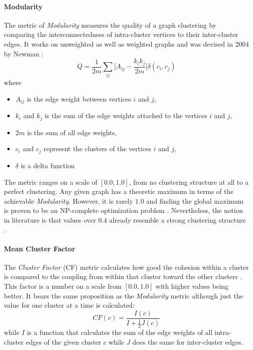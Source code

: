 \documentclass[12pt,a4paper]{report}
\begin{document}
\paragraph{Modularity}
The metric of \textit{Modularity} measures the quality of a graph clustering
by comparing the interconnectedness of intra-cluster vertices to their
inter-cluster edges. It works on unweighted as well as weighted graphs
\cite{clauset2004modularity, blondel2008modularity}
and was devised in 2004 by Newman \cite{newman2004fast}:
\[
  Q =
  \frac{1}{2m}
  \sum \limits _{ij}{\bigg[ A_{ij} - \frac{k_i k_j}{2m} \bigg]}
  \delta (c_i, c_j)
\]
where
\begin{itemize}[noitemsep]
  \item \(A_{ij}\) is the edge weight between vertices \(i\) and \(j\),
  \item \(k_i\) and \(k_j\) is the sum of the edge weights attached to
        the vertices \(i\) and \(j\),
  \item \(2m\) is the sum of all edge weights,
  \item \(c_i\) and \(c_j\) represent the clusters of the vertices \(i\) and \(j\),
  \item \(\delta\) is a delta function
\end{itemize}
The metric ranges on a scale of \([0.0, 1.0]\), from no clustering structure
at all to a perfect clustering. Any given graph has a theoretic maximum in terms
of the achievable \textit{Modularity}. However, it is rarely \(1.0\) and finding
the global maximum is proven to be an NP-complete optimization problem
\cite{brandes2006maximizing}. Nevertheless, the notion in literature is that
values over \(0.4\) already resemble a strong clustering structure
\cite{newman2004fast, fortunato2007resolution}.

\paragraph{Mean Cluster Factor}
The \textit{Cluster Factor} (CF) metric calculates how good the cohesion
within a cluster is compared to the coupling from within that cluster toward
the other clusters \cite{mitchell2006automatic}.
This factor is a number on a scale from \([0.0, 1.0]\) with higher values
being better. It bears the same proposition as the \textit{Modularity}
metric although just the value for one cluster at a time is calculated:
\[
  CF(c) = \frac{I(c)}{I + \frac{1}{2}J(c)}
\]
while $I$ is a function that calculates the sum of the edge weights of
all intra\hyp cluster edges of the given cluster $c$ while $J$ does the same
for inter\hyp cluster edges.
\end{document}
